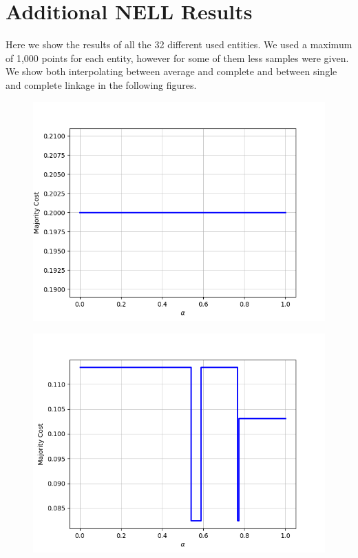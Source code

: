 \chapter{Additional NELL Results}
\label{app:nell}

Here we show the results of all the 32 different used entities. We used a maximum of 1,000 points for each entity, however for some of them less samples were given. We show both interpolating between average and complete and between single and complete linkage in the following figures.

\begin{figure}[h]
\centering
\begin{minipage}{.24\textwidth}
  \centering
  {\includegraphics[width=\linewidth]{plots/nell-ac/animal}}
\end{minipage}
\begin{minipage}{.24\textwidth}
  \centering
  {\includegraphics[width=\linewidth]{plots/nell-ac/arthropod}}

\end{minipage}
\end{figure}
